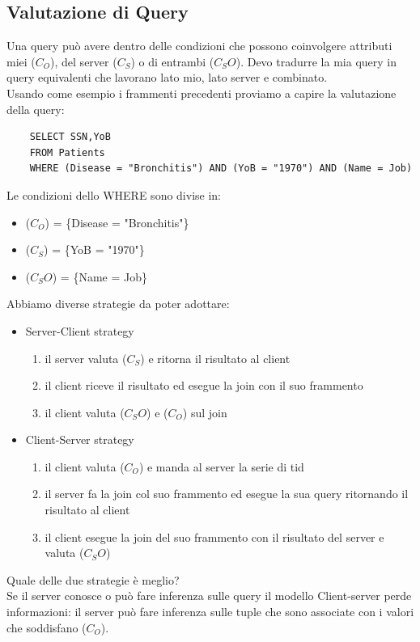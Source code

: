 \subsection{Valutazione di Query}
Una query può avere dentro delle condizioni che possono coinvolgere attributi miei (\(C_O\)), del server (\(C_S\)) o di entrambi (\(C_SO\)). Devo tradurre la mia query in query equivalenti che lavorano lato mio, lato server e combinato.\\
Usando come esempio i frammenti precedenti proviamo a capire la valutazione della query:
\begin{verbatim}
    SELECT SSN,YoB
    FROM Patients
    WHERE (Disease = "Bronchitis") AND (YoB = "1970") AND (Name = Job)
\end{verbatim}
Le condizioni dello WHERE sono divise in:
\begin{itemize}
    \item (\(C_O\)) = \{Disease = "Bronchitis"\}
    \item (\(C_S\)) = \{YoB = "1970"\}
    \item (\(C_SO\)) = \{Name = Job\}
\end{itemize}
Abbiamo diverse strategie da poter adottare:
\begin{itemize}
    \item Server-Client strategy 
    \begin{enumerate}
        \item il server valuta (\(C_S\)) e ritorna il risultato al client
        \item il client riceve il risultato ed esegue la join con il suo frammento
        \item il client valuta (\(C_SO\)) e (\(C_O\)) sul join
    \end{enumerate}
    \item Client-Server strategy
    \begin{enumerate}
        \item il client valuta (\(C_O\)) e manda al server la serie di tid
        \item il server fa la join col suo frammento ed esegue la sua query ritornando il risultato al client
        \item il client esegue la join del suo frammento con il risultato del server e valuta (\(C_SO\)) 
    \end{enumerate}
\end{itemize}
Quale delle due strategie è meglio?\\
Se il server conosce o può fare inferenza sulle query il modello Client-server perde informazioni: il server può fare inferenza sulle tuple che sono associate con i valori che soddisfano (\(C_O\)).\\
